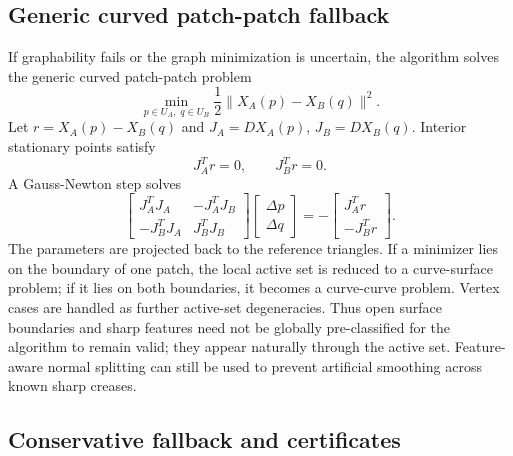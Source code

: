 \documentclass[preprint,12pt]{elsarticle}
\begin{document}
\subsection{Generic curved patch-patch fallback}
\label{subsec:patch_pair_fallback}

If graphability fails or the graph minimization is uncertain, the algorithm solves the generic curved patch-patch problem
\begin{equation}
    \min_{p\in U_A,\;q\in U_B}\frac{1}{2}\|X_A(p)-X_B(q)\|^2.
    \label{eq:patch_patch}
\end{equation}
Let $r=X_A(p)-X_B(q)$ and $J_A=DX_A(p)$, $J_B=DX_B(q)$. Interior stationary points satisfy
\begin{equation}
    J_A^T r=0,
    \qquad
    J_B^T r=0.
    \label{eq:stationarity_patch}
\end{equation}
A Gauss-Newton step solves
\begin{equation}
    \begin{bmatrix}
    J_A^TJ_A & -J_A^TJ_B\\
    -J_B^TJ_A & J_B^TJ_B
    \end{bmatrix}
    \begin{bmatrix}\Delta p\\ \Delta q\end{bmatrix}
    =-
    \begin{bmatrix}J_A^T r\\ -J_B^T r\end{bmatrix}.
    \label{eq:gn_patch}
\end{equation}
The parameters are projected back to the reference triangles. If a minimizer lies on the boundary of one patch, the local active set is reduced to a curve-surface problem; if it lies on both boundaries, it becomes a curve-curve problem. Vertex cases are handled as further active-set degeneracies. Thus open surface boundaries and sharp features need not be globally pre-classified for the algorithm to remain valid; they appear naturally through the active set. Feature-aware normal splitting can still be used to prevent artificial smoothing across known sharp creases.

\subsection{Conservative fallback and certificates}
\end{document}
